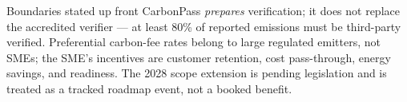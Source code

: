 \begin{formfield}{Boundaries stated up front}
CarbonPass \emph{prepares} verification; it does not replace the accredited
verifier --- at least 80\% of reported emissions must be third-party
verified\cite{omm}. Preferential carbon-fee rates belong to large regulated
emitters, not SMEs; the SME's incentives are customer retention, cost
pass-through, energy savings, and readiness\cite{moenvfee}. The 2028 scope
extension is pending legislation and is treated as a tracked roadmap event, not
a booked benefit\cite{akin}.
\end{formfield}
